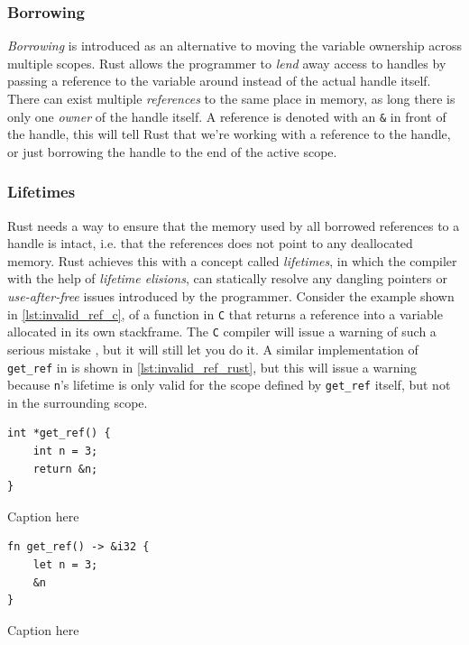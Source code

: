 \subsubsection{Borrowing} \hfill

\emph{Borrowing} is introduced as an alternative to moving the variable ownership across multiple scopes.
Rust allows the programmer to \emph{lend} away access to handles by passing a reference to the variable around instead of the actual handle itself.
There can exist multiple \emph{references} to the same place in memory, as long there is only one \emph{owner} of the handle itself.
A reference is denoted with an \texttt{\&} in front of the handle, this will tell Rust that we're working with a reference to the handle, or just borrowing the handle to the end of the active scope.


\subsubsection{Lifetimes} \hfill

Rust needs a way to ensure that the memory used by all borrowed references to a handle is intact, i.e. that the references does not point to any deallocated memory.
Rust achieves this with a concept called \emph{lifetimes}, in which  the compiler with the help of \emph{lifetime elisions}, can statically resolve any dangling pointers or \emph{use-after-free} issues introduced by the programmer.
Consider the example shown in \autoref{lst:invalid_ref_c}, of a function in \texttt{C} that returns a reference into a variable allocated in its own stackframe.
The \texttt{C} compiler will issue a warning of such a serious mistake , but it will still let you do it.
A similar implementation of \texttt{get\_ref} in \rust is shown in \autoref{lst:invalid_ref_rust}, but this will issue a warning because \texttt{n}'s lifetime is only valid for the scope defined by \texttt{get\_ref} itself, but not in the surrounding scope.

\begin{listing}[tb]
\begin{verbatim}
int *get_ref() {
    int n = 3;
    return &n;
}
\end{verbatim}
\caption{Caption here}
\label{lst:invalid_ref_c}
\end{listing}

\begin{listing}[tb]
\begin{verbatim}
fn get_ref() -> &i32 {
    let n = 3;
    &n
}
\end{verbatim}
\caption{Caption here}
\label{lst:invalid_ref_rust}
\end{listing}

